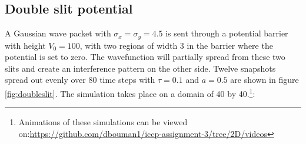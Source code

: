 \subsection*{Double slit potential}
A Gaussian wave packet with $\sigma_x = \sigma_y = 4.5$ is sent through a potential barrier with height $V_0 = 100$, with two regions of width 3 in the barrier where the potential is set to zero. The wavefunction will partially spread from these two slits and create an interference pattern on the other side. Twelve snapshots spread out evenly over 80 time steps with $\tau = 0.1$ and $a=0.5$ are shown in figure \ref{fig:doubleslit}. The simulation takes place on a domain of 40 by 40.\footnote{Animations of these simulations can be viewed on:\url{https://github.com/dbouman1/iccp-assignment-3/tree/2D/videos}}:

%
\def\arraystretch{0.6}%
\setlength\tabcolsep{0.5mm}
